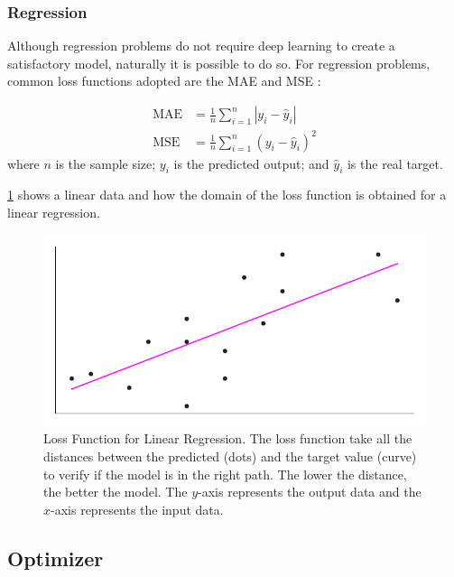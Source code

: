 \subsubsection*{Regression}

Although regression problems do not require deep learning to create a satisfactory model, naturally it is possible to do so.
For regression problems, common loss functions adopted are the MAE and MSE \cite{bussab2017}:

\begin{align}
    \text{MAE} &= \frac{1}{n} \sum_{i=1}^n |y_i - \hat{y}_i| 
    \label{eq:mae} \\
    \text{MSE} &= \frac{1}{n} \sum_{i=1}^n (y_i - \hat{y}_i)^2
    \label{eq:mse}
\end{align}
%
where \(n\) is the sample size; \(y_i\) is the predicted output; and \(\hat{y}_i\) is the real target.

\cref{fig:mae_chart} shows a linear data and how the domain of the loss function is obtained for a linear regression.
%
\begin{figure}[!htb]
    \centering
    \caption[Loss Function for Linear Regression]{Loss Function for Linear Regression. The loss function take all the distances between the predicted (dots) and the target value (curve) to verify if the model is in the right path. The lower the distance, the better the model. The \(y\)-axis represents the output data and the \(x\)-axis represents the input data.}
    \includegraphics{figures/2review/nn/mae_chart.pdf}
    
    \label{fig:mae_chart}
\end{figure}

\subsection{Optimizer}\label{sec:optimizer}


